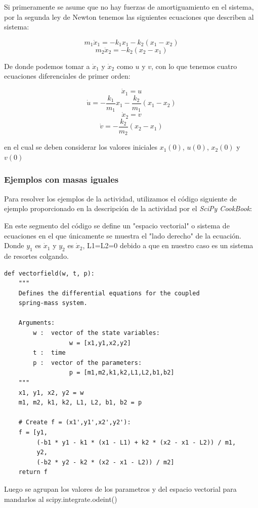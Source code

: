 \documentclass{article}
\begin{document}
\newpage

Si primeramente se asume que no hay fuerzas de amortiguamiento en el sistema, por la segunda ley de Newton tenemos las siguientes ecuaciones que describen al sistema:

\[ m_1\ddot{x}_1=-k_1x_1-k_2(x_1-x_2) \]
\[ m_2\ddot{x}_2=-k_2(x_2-x_1) \]

De donde podemos tomar a $\dot{x}_1$ y $\dot{x}_2$ como $u$ y $v$, con lo que tenemos cuatro ecuaciones diferenciales de primer orden:

\[ \dot{x}_1=u \]
\[ \dot{u}=-\frac{k_1}{m_1}x_1-\frac{k_2}{m_1}(x_1-x_2) \]
\[ \dot{x}_2=v \]
\[ \dot{v}=-\frac{k_2}{m_2}(x_2-x_1) \]

en el cual se deben considerar los valores iniciales $x_1(0)$, $u(0)$, $x_2(0)$ y $v(0)$

\subsubsection{Ejemplos con masas iguales}

Para resolver los ejemplos de la actividad, utilizamos el código siguiente de ejemplo proporcionado en la descripción de la actividad por el \textit{SciPy CookBook}:

En este segmento del código se define un "espacio vectorial" o sistema de ecuaciones en el que únicamente se muestra el "lado derecho" de la ecuación.
Donde $y_1$ es $\dot{x}_1$ y $y_2$ es $\dot{x}_2$, L1=L2=0 debido a que en nuestro caso es un sistema de resortes colgando.

\begin{framed}
\begin{verbatim}
def vectorfield(w, t, p):
    """
    Defines the differential equations for the coupled 
    spring-mass system.

    Arguments:
        w :  vector of the state variables:
                  w = [x1,y1,x2,y2]
        t :  time
        p :  vector of the parameters:
                  p = [m1,m2,k1,k2,L1,L2,b1,b2]
    """
    x1, y1, x2, y2 = w
    m1, m2, k1, k2, L1, L2, b1, b2 = p

    # Create f = (x1',y1',x2',y2'):
    f = [y1,
         (-b1 * y1 - k1 * (x1 - L1) + k2 * (x2 - x1 - L2)) / m1,
         y2,
         (-b2 * y2 - k2 * (x2 - x1 - L2)) / m2]
    return f
\end{verbatim}
\end{framed}

Luego se agrupan los valores de los parametros y del espacio vectorial para mandarlos al scipy.integrate.odeint() 
\end{document}
